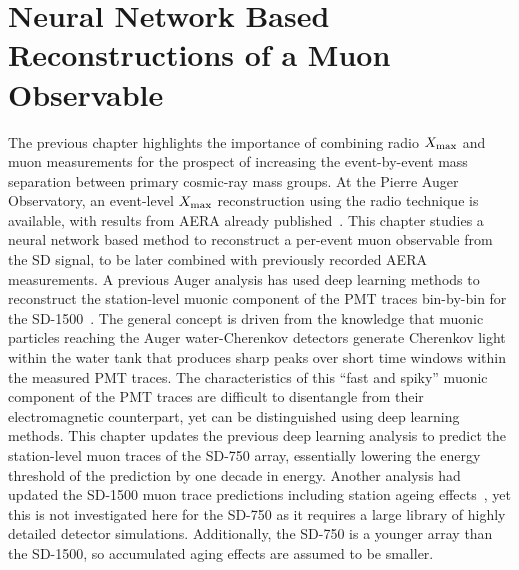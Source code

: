 %
%
\chapter{Neural Network Based Reconstructions of a Muon Observable}\label{chap:nn}
The previous chapter highlights the importance of combining radio $X_{\rm max}$ and muon measurements for the prospect of increasing the event-by-event mass separation between primary cosmic-ray mass groups.
At the Pierre Auger Observatory, an event-level $X_{\rm max}$ reconstruction using the radio technique is available, with results from AERA already published~\cite{auger_prd2024_aeraxmax,auger_prl2024_aeraxmax}.
This chapter studies a neural network based method to reconstruct a per-event muon observable from the SD signal, to be later combined with previously recorded AERA measurements.
A previous Auger analysis has used deep learning methods to reconstruct the station-level muonic component of the PMT traces bin-by-bin for the SD-1500~\cite{auger_jinst2021_dnnmuons,juanmiguel_phd2020}.
The general concept is driven from the knowledge that muonic particles reaching the Auger water-Cherenkov detectors generate Cherenkov light within the water tank that produces sharp peaks over short time windows within the measured PMT traces.
The characteristics of this ``fast and spiky'' muonic component of the PMT traces are difficult to disentangle from their electromagnetic counterpart, yet can be distinguished using deep learning methods. 
This chapter updates the previous deep learning analysis to predict the station-level muon traces of the SD-750 array, essentially lowering the energy threshold of the prediction by one decade in energy.
Another analysis had updated the SD-1500 muon trace predictions including station ageing effects~\cite{orazio_phd2023}, yet this is not investigated here for the SD-750 as it requires a large library of highly detailed detector simulations.
Additionally, the SD-750 is a younger array than the SD-1500, so accumulated aging effects are assumed to be smaller.





